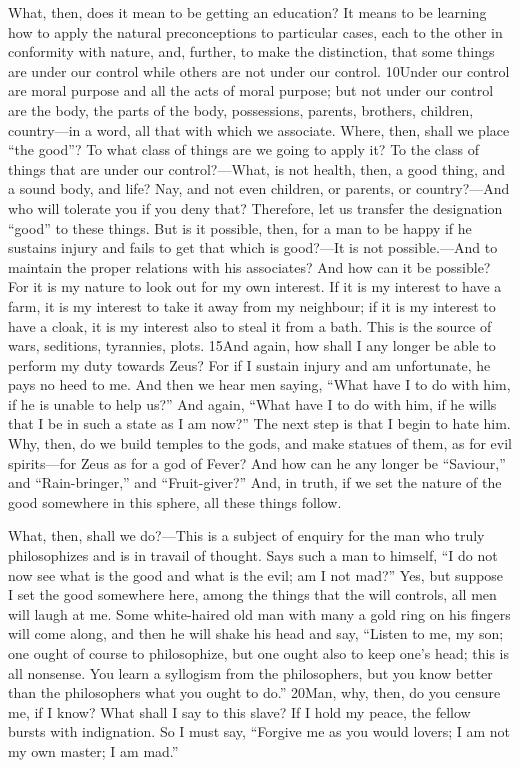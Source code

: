 What, then, does it mean to be getting an education? It means to be learning how to apply the natural preconceptions to particular cases, each to the other in conformity with nature, and, further, to make the distinction, that some things are under our control while others are not under our control. 10Under our control are moral purpose and all the acts of moral purpose; but not under our control are the body, the parts of the body, possessions, parents, brothers, children, country—in a word, all that with which we associate. Where, then, shall we place ``the good''? To what class of things are we going to apply it? To the class of things that are under our control?—What, is not health, then, a good thing, and a sound body, and life? Nay, and not even children, or parents, or country?—And who will tolerate you if you deny that? Therefore, let us transfer the designation ``good'' to these things. But is it possible, then, for a man to be happy if he sustains injury and fails to get that which is good?—It is not possible.—And to maintain the proper relations with his associates? And how can it be possible? For it is my nature to look out for my own interest. If it is my interest to have a farm, it is my interest to take it away from my neighbour; if it is my interest to have a cloak, it is my interest also to steal it from a bath. This is the source of wars, seditions, tyrannies, plots. 15And again, how shall I any longer be able to perform my duty towards Zeus? For if I sustain injury and am unfortunate, he pays no heed to me. And then we hear men saying, ``What have I to do with him, if he is unable to help us?'' And again, ``What have I to do with him, if he wills that I be in such a state as I am now?'' The next step is that I begin to hate him. Why, then, do we build temples to the gods, and make statues of them, as for evil spirits—for Zeus as for a god of Fever? And how can he any longer be ``Saviour,'' and ``Rain-bringer,'' and ``Fruit-giver?'' And, in truth, if we set the nature of the good somewhere in this sphere, all these things follow.

What, then, shall we do?—This is a subject of enquiry for the man who truly philosophizes and is in travail of thought. Says such a man to himself, ``I do not now see what is the good and what is the evil; am I not mad?'' Yes, but suppose I set the good somewhere here, among the things that the will controls, all men will laugh at me. Some white-haired old man with many a gold ring on his fingers will come along, and then he will shake his head and say, ``Listen to me, my son; one ought of course to philosophize, but one ought also to keep one's head; this is all nonsense. You learn a syllogism from the philosophers, but you know better than the philosophers what you ought to do.'' 20Man, why, then, do you censure me, if I know? What shall I say to this slave? If I hold my peace, the fellow bursts with indignation. So I must say, ``Forgive me as you would lovers; I am not my own master; I am mad.''

